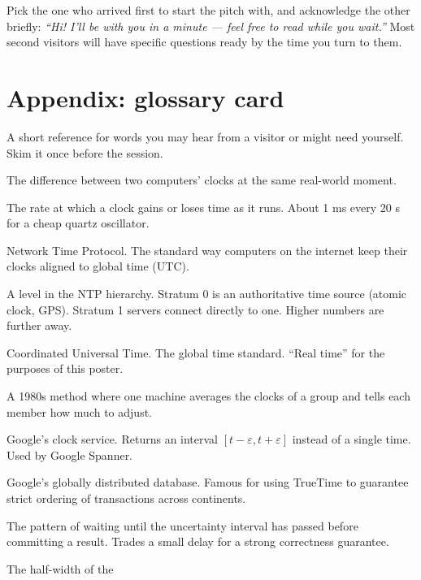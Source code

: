 \documentclass[a4paper,11pt]{article}
\begin{document}
Pick the one who arrived first to start the pitch with, and
acknowledge the other briefly: \emph{``Hi! I'll be with you in a
minute --- feel free to read while you wait.''} Most second
visitors will have specific questions ready by the time you turn
to them.

\section{Appendix: glossary card}

A short reference for words you may hear from a visitor or might
need yourself. Skim it once before the session.

\begin{description}[leftmargin=*,style=nextline]
  \item[Clock skew] The difference between two computers' clocks
        at the same real-world moment.
  \item[Clock drift] The rate at which a clock gains or loses
        time as it runs. About 1 ms every 20 s for a cheap quartz
        oscillator.
  \item[NTP] Network Time Protocol. The standard way computers on
        the internet keep their clocks aligned to global time
        (UTC).
  \item[Stratum] A level in the NTP hierarchy. Stratum 0 is an
        authoritative time source (atomic clock, GPS). Stratum 1
        servers connect directly to one. Higher numbers are
        further away.
  \item[UTC] Coordinated Universal Time. The global time
        standard. ``Real time'' for the purposes of this poster.
  \item[Berkeley algorithm] A 1980s method where one machine
        averages the clocks of a group and tells each member how
        much to adjust.
  \item[TrueTime] Google's clock service. Returns an interval
        $[t - \varepsilon, t + \varepsilon]$ instead of a single
        time. Used by Google Spanner.
  \item[Spanner] Google's globally distributed database. Famous
        for using TrueTime to guarantee strict ordering of
        transactions across continents.
  \item[Commit-wait] The pattern of waiting until the uncertainty
        interval has passed before committing a result. Trades a
        small delay for a strong correctness guarantee.
  \item[Epsilon ($\varepsilon$)] The half-width of the

\end{description}
\end{document}
